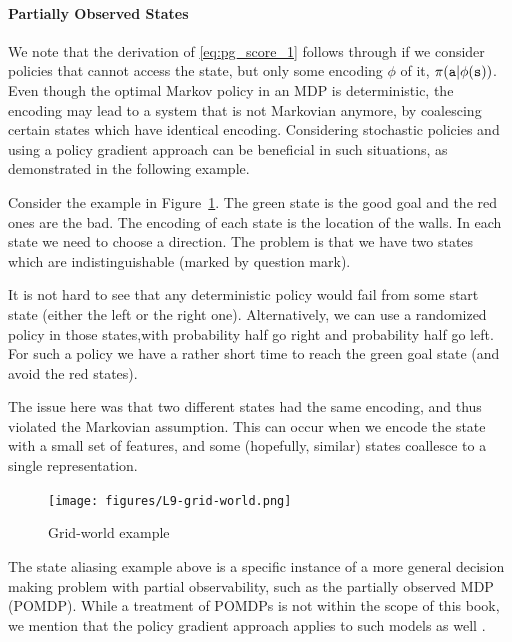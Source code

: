 \paragraph{Partially Observed States} We note that the derivation of \eqref{eq:pg_score_1} follows through if we consider policies that cannot access the state, but only some encoding $\phi$ of it, $\pi({\tt a}|\phi({\tt s}))$. Even though the optimal Markov policy in an MDP is deterministic, the encoding may lead to a system that is not Markovian anymore, by
coalescing certain states which have identical encoding. Considering stochastic policies and using a policy gradient approach can be beneficial in such situations, as demonstrated in the following example. 
\begin{example}
    Consider the example in Figure~\ref{fig:L9-grid-world}. The green
state is the good goal and the red ones are the bad. The encoding of
each state is the location of the walls. In each state we need to
choose a direction. The problem is that we have two states which are
indistinguishable (marked by question mark).

It is not hard to see that any deterministic policy would fail from
some start state (either the left or the right one). Alternatively,
we can use a randomized policy in those states,with probability half
go right and probability half go left. For such a policy we have a
rather short time to reach the green goal state (and avoid the red
states).

The issue here was that two different states had the same encoding,
and thus violated the Markovian assumption. This can occur when we
encode the state with a small set of features, and some (hopefully,
similar) states coallesce to a single representation.

\begin{figure}
  \begin{centering}
  \texttt{[image: figures/L9-grid-world.png]}\\
  \caption{Grid-world example }\label{fig:L9-grid-world}
  \end{centering}
\end{figure}
\end{example}

\begin{remark}
    The state aliasing example above is a specific instance of a more general decision making problem with partial observability, such as the partially observed MDP (POMDP). While a treatment of POMDPs is not within the scope of this book, we mention that the policy gradient approach applies to such models as well \cite{BaxterB01}.
\end{remark}


